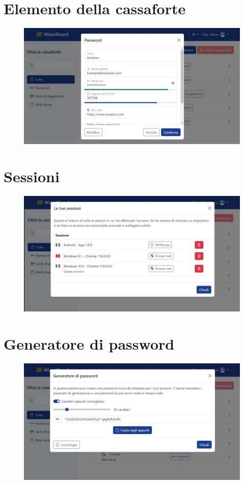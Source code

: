 \documentclass[a4paper]{report}
\begin{document}
\section{Elemento della cassaforte}
\begin{figure}[H]
        \centering
        \includegraphics[width=1.0\textwidth]{figures/interfaces/element}
    \end{figure}
\section{Sessioni}
\begin{figure}[H]
        \centering
        \includegraphics[width=1.0\textwidth]{figures/interfaces/sessions}
    \end{figure}
\section{Generatore di password}
\begin{figure}[H]
        \centering
        \includegraphics[width=1.0\textwidth]{figures/interfaces/passwordGenerator}
    \end{figure}
\end{document}
